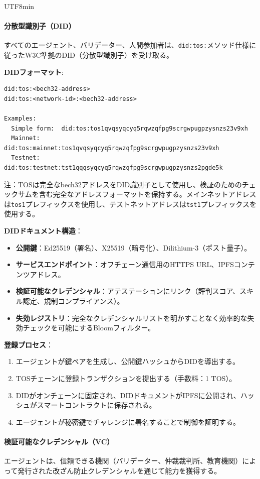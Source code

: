 \documentclass[11pt]{article}
\begin{document}
\begin{CJK}{UTF8}{min}
\paragraph{分散型識別子（DID）}
すべてのエージェント、バリデーター、人間参加者は、\texttt{did:tos:}メソッド仕様に従ったW3C準拠のDID（分散型識別子）を受け取る。

\textbf{DIDフォーマット}:
\begin{verbatim}
did:tos:<bech32-address>
did:tos:<network-id>:<bech32-address>

Examples:
  Simple form:  did:tos:tos1qvqsyqcyq5rqwzqfpg9scrgwpugpzysnzs23v9xh
  Mainnet:      did:tos:mainnet:tos1qvqsyqcyq5rqwzqfpg9scrgwpugpzysnzs23v9xh
  Testnet:      did:tos:testnet:tst1qqqsyqcyq5rqwzqfpg9scrgwpugpzysnzs2pgde5k
\end{verbatim}
注：TOSは完全なbech32アドレスをDID識別子として使用し、検証のためのチェックサムを含む完全なアドレスフォーマットを保持する。メインネットアドレスは\texttt{tos1}プレフィックスを使用し、テストネットアドレスは\texttt{tst1}プレフィックスを使用する。

\textbf{DIDドキュメント構造}：
\begin{itemize}[noitemsep]
  \item \textbf{公開鍵}：Ed25519（署名）、X25519（暗号化）、Dilithium-3（ポスト量子）。
  \item \textbf{サービスエンドポイント}：オフチェーン通信用のHTTPS URL、IPFSコンテンツアドレス。
  \item \textbf{検証可能なクレデンシャル}：アテステーションにリンク（評判スコア、スキル認定、規制コンプライアンス）。
  \item \textbf{失効レジストリ}：完全なクレデンシャルリストを明かすことなく効率的な失効チェックを可能にするBloomフィルター。
\end{itemize}

\textbf{登録プロセス}：
\begin{enumerate}[noitemsep]
  \item エージェントが鍵ペアを生成し、公開鍵ハッシュからDIDを導出する。
  \item TOSチェーンに登録トランザクションを提出する（手数料：1 TOS）。
  \item DIDがオンチェーンに固定され、DIDドキュメントがIPFSに公開され、ハッシュがスマートコントラクトに保存される。
  \item エージェントが秘密鍵でチャレンジに署名することで制御を証明する。
\end{enumerate}

\paragraph{検証可能なクレデンシャル（VC）}
エージェントは、信頼できる機関（バリデーター、仲裁裁判所、教育機関）によって発行された改ざん防止クレデンシャルを通じて能力を獲得する。


\end{CJK}
\end{document}
